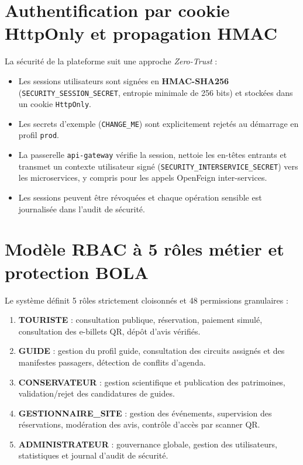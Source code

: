 \documentclass[12pt,a4paper]{report}
\begin{document}
\section{Authentification par cookie HttpOnly et propagation HMAC}
La sécurité de la plateforme suit une approche \emph{Zero-Trust} :
\begin{itemize}
    \item Les sessions utilisateurs sont signées en \textbf{HMAC-SHA256} (\texttt{SECURITY\_SESSION\_SECRET}, entropie minimale de 256 bits) et stockées dans un cookie \texttt{HttpOnly}.
    \item Les secrets d'exemple (\texttt{CHANGE\_ME}) sont explicitement rejetés au démarrage en profil \texttt{prod}.
    \item La passerelle \texttt{api-gateway} vérifie la session, nettoie les en-têtes entrants et transmet un contexte utilisateur signé (\texttt{SECURITY\_INTERSERVICE\_SECRET}) vers les microservices, y compris pour les appels OpenFeign inter-services.
    \item Les sessions peuvent être révoquées et chaque opération sensible est journalisée dans l'audit de sécurité.
\end{itemize}

\section{Modèle RBAC à 5 rôles métier et protection BOLA}
Le système définit 5 rôles strictement cloisonnés et 48 permissions granulaires :
\begin{enumerate}
    \item \textbf{TOURISTE} : consultation publique, réservation, paiement simulé, consultation des e-billets QR, dépôt d'avis vérifiés.
    \item \textbf{GUIDE} : gestion du profil guide, consultation des circuits assignés et des manifestes passagers, détection de conflits d'agenda.
    \item \textbf{CONSERVATEUR} : gestion scientifique et publication des patrimoines, validation/rejet des candidatures de guides.
    \item \textbf{GESTIONNAIRE\_SITE} : gestion des événements, supervision des réservations, modération des avis, contrôle d'accès par scanner QR.
    \item \textbf{ADMINISTRATEUR} : gouvernance globale, gestion des utilisateurs, statistiques et journal d'audit de sécurité.
\end{enumerate}
\end{document}
